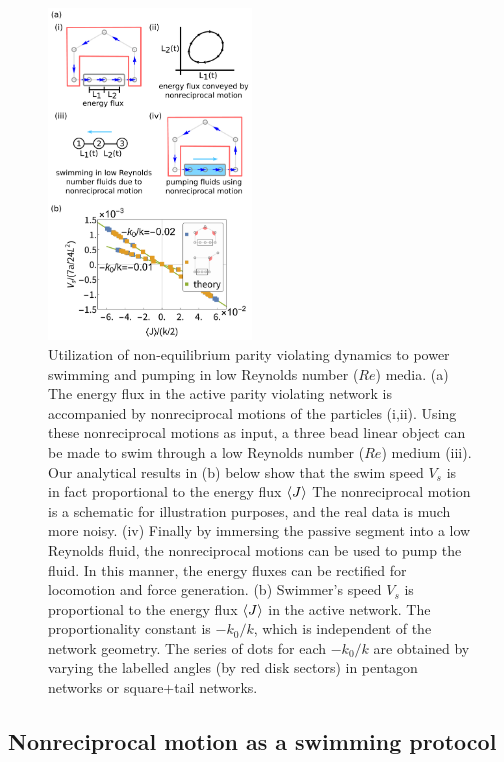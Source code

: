 \documentclass[
 preprint,
 preprintnumbers,
 amsmath,amssymb,
 aps,
 pre,
 longbibliography,
 superscriptaddress,
 10pt, twocolumn
]{revtex4-1}
\begin{document}
\begin{figure}[h!]
	\centering
	\includegraphics[width=0.48\textwidth]{swimmer.pdf}
    \caption{Utilization of non-equilibrium parity violating dynamics to power swimming and pumping in low Reynolds number ($Re$) media.
    (a) The energy flux in the active parity violating network is accompanied by nonreciprocal motions of the particles (i,ii). Using these nonreciprocal motions as input, a three bead linear object can be made to swim through a low Reynolds number ($Re$) medium (iii). Our analytical results in (b) below show that the swim speed $V_s$ is in fact proportional to the energy flux $\expval{J}$ The nonreciprocal motion is a schematic for illustration purposes, and the real data is much more noisy. (iv) Finally by immersing the passive segment into a low Reynolds fluid, the nonreciprocal motions can be used to pump the fluid. In this manner, the energy fluxes can be rectified for locomotion and force generation. 
    (b) Swimmer's speed $V_s$ is proportional to the energy flux $\expval{J}$ in the active network. The proportionality constant is $-k_0/k$, which is independent of the network geometry. The series of dots for each $-k_0/k$ are obtained by varying the labelled angles (by red disk sectors) in pentagon networks or square+tail networks.
    }
    \label{fig:swimmer}
\end{figure}



\subsection{Nonreciprocal motion as a swimming protocol}
\end{document}
